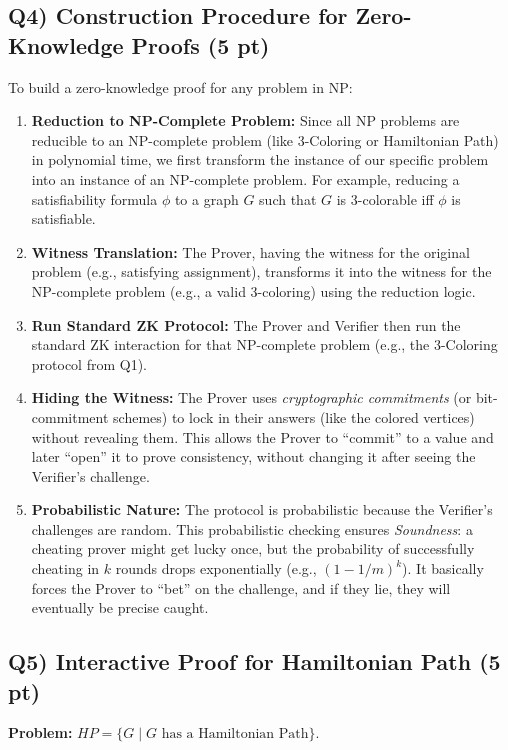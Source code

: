 \documentclass[11pt]{article}
\begin{document}
\subsection*{Q4) Construction Procedure for Zero-Knowledge Proofs (5 pt)}
To build a zero-knowledge proof for any problem in NP:
\begin{enumerate}
    \item \textbf{Reduction to NP-Complete Problem:} Since all NP problems are reducible to an NP-complete problem (like 3-Coloring or Hamiltonian Path) in polynomial time, we first transform the instance of our specific problem into an instance of an NP-complete problem. For example, reducing a satisfiability formula $\phi$ to a graph $G$ such that $G$ is 3-colorable iff $\phi$ is satisfiable.
    \item \textbf{Witness Translation:} The Prover, having the witness for the original problem (e.g., satisfying assignment), transforms it into the witness for the NP-complete problem (e.g., a valid 3-coloring) using the reduction logic.
    \item \textbf{Run Standard ZK Protocol:} The Prover and Verifier then run the standard ZK interaction for that NP-complete problem (e.g., the 3-Coloring protocol from Q1).
    \item \textbf{Hiding the Witness:} The Prover uses \textit{cryptographic commitments} (or bit-commitment schemes) to lock in their answers (like the colored vertices) without revealing them. This allows the Prover to ``commit'' to a value and later ``open'' it to prove consistency, without changing it after seeing the Verifier's challenge.
    \item \textbf{Probabilistic Nature:} The protocol is probabilistic because the Verifier's challenges are random. This probabilistic checking ensures \textit{Soundness}: a cheating prover might get lucky once, but the probability of successfully cheating in $k$ rounds drops exponentially (e.g., $(1 - 1/m)^k$). It basically forces the Prover to ``bet'' on the challenge, and if they lie, they will eventually be precise caught.
\end{enumerate}

\subsection*{Q5) Interactive Proof for Hamiltonian Path (5 pt)}
\textbf{Problem:} $HP = \{ G \mid G \text{ has a Hamiltonian Path} \}$.
\end{document}
